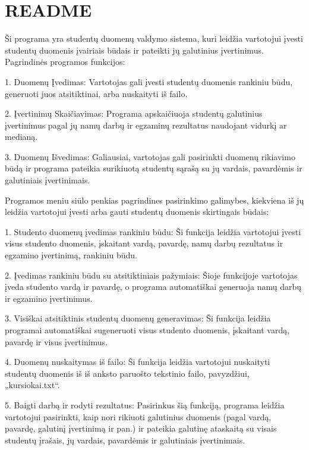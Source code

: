\chapter{README}
\hypertarget{md__r_e_a_d_m_e}{}\label{md__r_e_a_d_m_e}
Ši programa yra studentų duomenų valdymo sistema, kuri leidžia vartotojui įvesti studentų duomenis įvairiais būdais ir pateikti jų galutinius įvertinimus. Pagrindinės programos funkcijos\+: \begin{DoxyVerb}1.  Duomenų Įvedimas: Vartotojas gali įvesti studentų duomenis rankiniu būdu, generuoti juos atsitiktinai, arba nuskaityti iš failo.

2.  Įvertinimų Skaičiavimas: Programa apskaičiuoja studentų galutinius įvertinimus pagal jų namų darbų ir egzaminų rezultatus naudojant vidurkį ar medianą.

3.  Duomenų Išvedimas: Galiausiai, vartotojas gali pasirinkti duomenų rikiavimo būdą ir programa pateikia surikiuotą studentų sąrašą su jų vardais, pavardėmis ir galutiniais įvertinimais.
\end{DoxyVerb}
 Programos meniu siūlo penkias pagrindines pasirinkimo galimybes, kiekviena iš jų leidžia vartotojui įvesti arba gauti studentų duomenis skirtingais būdais\+: \begin{DoxyVerb}1.  Studento duomenų įvedimas rankiniu būdu: Ši funkcija leidžia vartotojui įvesti visus studento duomenis, įskaitant vardą, pavardę, namų darbų rezultatus ir egzamino įvertinimą, rankiniu būdu.

2.  Įvedimas rankiniu būdu su atsitiktiniais pažymiais: Šioje funkcijoje vartotojas įveda studento vardą ir pavardę, o programa automatiškai generuoja namų darbų ir egzamino įvertinimus.

3.  Visiškai atsitiktinis studentų duomenų generavimas: Ši funkcija leidžia programai automatiškai sugeneruoti visus studento duomenis, įskaitant vardą, pavardę ir visus įvertinimus.

4.  Duomenų nuskaitymas iš failo: Ši funkcija leidžia vartotojui nuskaityti studentų duomenis iš iš anksto paruošto tekstinio failo, pavyzdžiui, „kursiokai.txt“.

5.  Baigti darbą ir rodyti rezultatus: Pasirinkus šią funkciją, programa leidžia vartotojui pasirinkti, kaip nori rikiuoti galutinius duomenis (pagal vardą, pavardę, galutinį įvertinimą ir pan.) ir pateikia galutinę ataskaitą su visais studentų įrašais, jų vardais, pavardėmis ir galutiniais įvertinimais.
\end{DoxyVerb}


